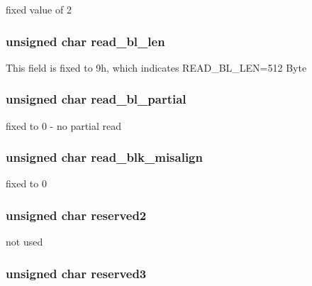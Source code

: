 fixed value of 2 \hypertarget{struct_c_s_d_v2_af43ab7cd256a4134cd3b78bdecb9d7c5}{
\subsubsection[{read\-\_\-bl\-\_\-len}]{\setlength{\rightskip}{0pt plus 5cm}unsigned char read\-\_\-bl\-\_\-len}}\label{struct_c_s_d_v2_af43ab7cd256a4134cd3b78bdecb9d7c5}
This field is fixed to 9h, which indicates R\-E\-A\-D\-\_\-\-B\-L\-\_\-\-L\-E\-N=512 Byte \hypertarget{struct_c_s_d_v2_a7387a4ab3ec1161c246ed02941e1325e}{
\subsubsection[{read\-\_\-bl\-\_\-partial}]{\setlength{\rightskip}{0pt plus 5cm}unsigned char read\-\_\-bl\-\_\-partial}}\label{struct_c_s_d_v2_a7387a4ab3ec1161c246ed02941e1325e}
fixed to 0 -\/ no partial read \hypertarget{struct_c_s_d_v2_a31c0f3174289d3fb8abade294770fc33}{
\subsubsection[{read\-\_\-blk\-\_\-misalign}]{\setlength{\rightskip}{0pt plus 5cm}unsigned char read\-\_\-blk\-\_\-misalign}}\label{struct_c_s_d_v2_a31c0f3174289d3fb8abade294770fc33}
fixed to 0 \hypertarget{struct_c_s_d_v2_add22350e7fe29ca6649dd6564e8425ea}{
\subsubsection[{reserved2}]{\setlength{\rightskip}{0pt plus 5cm}unsigned char reserved2}}\label{struct_c_s_d_v2_add22350e7fe29ca6649dd6564e8425ea}
not used \hypertarget{struct_c_s_d_v2_a6525406821be82277577a768a2d4e904}{
\subsubsection[{reserved3}]{\setlength{\rightskip}{0pt plus 5cm}unsigned char reserved3}}\label{struct_c_s_d_v2_a6525406821be82277577a768a2d4e904}
